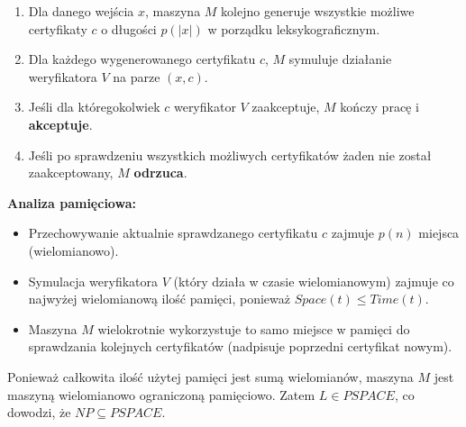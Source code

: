 \documentclass{article}
\begin{document}
\begin{enumerate}
    \item Dla danego wejścia $x$, maszyna $M$ kolejno generuje wszystkie możliwe certyfikaty $c$ o długości $p(|x|)$ w porządku leksykograficznym.
    \item Dla każdego wygenerowanego certyfikatu $c$, $M$ symuluje działanie weryfikatora $V$ na parze $(x, c)$.
    \item Jeśli dla któregokolwiek $c$ weryfikator $V$ zaakceptuje, $M$ kończy pracę i \textbf{akceptuje}.
    \item Jeśli po sprawdzeniu wszystkich możliwych certyfikatów żaden nie został zaakceptowany, $M$ \textbf{odrzuca}.
\end{enumerate}

\textbf{Analiza pamięciowa:}
\begin{itemize}
    \item Przechowywanie aktualnie sprawdzanego certyfikatu $c$ zajmuje $p(n)$ miejsca (wielomianowo).
    \item Symulacja weryfikatora $V$ (który działa w czasie wielomianowym) zajmuje co najwyżej wielomianową ilość pamięci, ponieważ $Space(t) \le Time(t)$.
    \item Maszyna $M$ wielokrotnie wykorzystuje to samo miejsce w pamięci do sprawdzania kolejnych certyfikatów (nadpisuje poprzedni certyfikat nowym).
\end{itemize}

Ponieważ całkowita ilość użytej pamięci jest sumą wielomianów, maszyna $M$ jest maszyną wielomianowo ograniczoną pamięciowo. Zatem $L \in PSPACE$, co dowodzi, że $NP \subseteq PSPACE$.
\end{document}

